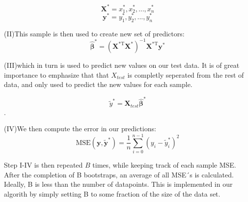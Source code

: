 \documentclass[11pt, a4paper]{article}
\begin{document}
$$\bm{X^*} = x_{1}^{*}, x_{2}^{*}, ... ,x_{n}^{*}$$
$$\bm{y}^*= y_{1}^{*}, y_{2}^{*}, ... ,y_{n}^{*}$$

(II)This sample is then used to create new set of predictors:
\[
  \bm{\hat{\beta}}^* = \left(\bm{X}^\text{*T}\bm{X}^*\right)^{-1}\bm{X}^\text{*T}\bm{y}^*
\]

(III)which in turn is used to predict new values on our test data. It is of great importance to emphasize that that $X_{test}$ is completly seperated from the rest of data, and only used to predict the new values for each sample.


$$\tilde{y}^* = \bm{X}_{test}\bm{\hat{\beta}^*}$$.

(IV)We then compute the error in our predictions:
\[
  \text{MSE}(\boldsymbol{y},\boldsymbol{\tilde{y}^*}) = \frac{1}{n}
  \sum_{i=0}^{n-1}(y_i-\tilde{y}^{*}_i)^2
\]

Step I-IV is then repeated $B$ times, while keeping track of each sample MSE. After the completion of B bootstraps, an average of all MSE´s is calculated. Ideally, B is less than the number of datapoints. This is implemented in our algorith by simply setting B to some fraction of the size of the data set. 
\end{document}
